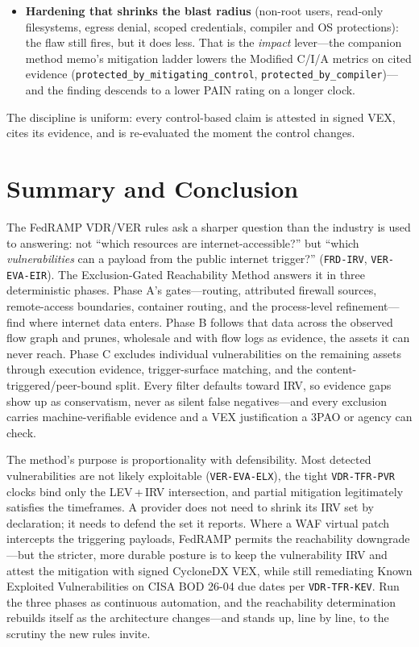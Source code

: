 \documentclass[11pt]{article}
\newcommand{\code}[1]{\texttt{#1}}
\begin{document}
\begin{itemize}[leftmargin=1.5em, nosep]
\item \textbf{Hardening that shrinks the blast radius} (non-root users, read-only filesystems, egress denial, scoped credentials, compiler and OS protections): the flaw still fires, but it does less. That is the \emph{impact} lever---the companion method memo's mitigation ladder lowers the Modified C/I/A metrics on cited evidence (\code{protected\_by\_mitigating\_control}, \code{protected\_by\_compiler})---and the finding descends to a lower PAIN rating on a longer clock.
\end{itemize}
The discipline is uniform: every control-based claim is attested in signed VEX, cites its evidence, and is re-evaluated the moment the control changes.

\section{Summary and Conclusion}
The FedRAMP VDR/VER rules ask a sharper question than the industry is used to answering: not ``which resources are internet-accessible?'' but ``which \emph{vulnerabilities} can a payload from the public internet trigger?'' (\code{FRD-IRV}, \code{VER-EVA-EIR}). The Exclusion-Gated Reachability Method answers it in three deterministic phases. Phase A's gates---routing, attributed firewall sources, remote-access boundaries, container routing, and the process-level refinement---find where internet data enters. Phase B follows that data across the observed flow graph and prunes, wholesale and with flow logs as evidence, the assets it can never reach. Phase C excludes individual vulnerabilities on the remaining assets through execution evidence, trigger-surface matching, and the content-triggered/peer-bound split. Every filter defaults toward IRV, so evidence gaps show up as conservatism, never as silent false negatives---and every exclusion carries machine-verifiable evidence and a VEX justification a 3PAO or agency can check.

The method's purpose is proportionality with defensibility. Most detected vulnerabilities are not likely exploitable (\code{VER-EVA-ELX}), the tight \code{VDR-TFR-PVR} clocks bind only the LEV\,+\,IRV intersection, and partial mitigation legitimately satisfies the timeframes. A provider does not need to shrink its IRV set by declaration; it needs to defend the set it reports. Where a WAF virtual patch intercepts the triggering payloads, FedRAMP permits the reachability downgrade---but the stricter, more durable posture is to keep the vulnerability IRV and attest the mitigation with signed CycloneDX VEX, while still remediating Known Exploited Vulnerabilities on CISA BOD 26-04 due dates per \code{VDR-TFR-KEV}. Run the three phases as continuous automation, and the reachability determination rebuilds itself as the architecture changes---and stands up, line by line, to the scrutiny the new rules invite.
\end{document}
